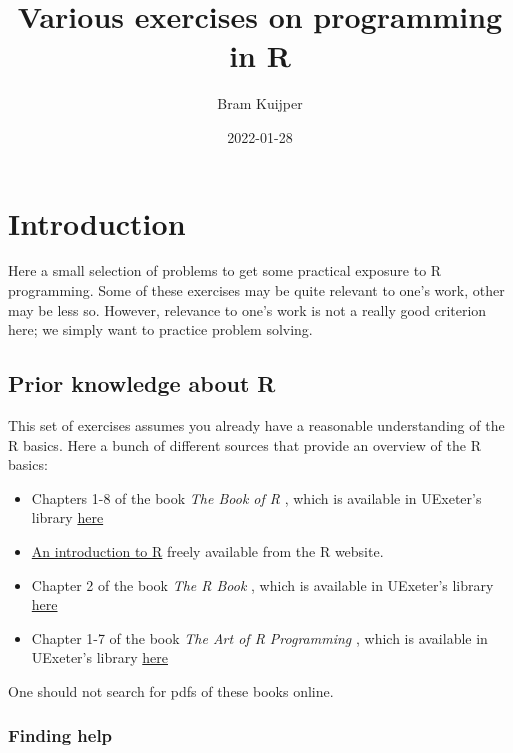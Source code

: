 \documentclass[
]{book}
\title{Various exercises on programming in R}
\author{Bram Kuijper}
\date{2022-01-28}
\providecommand{\tightlist}{%
  \setlength{\itemsep}{0pt}\setlength{\parskip}{0pt}}
\begin{document}
\maketitle

{
\setcounter{tocdepth}{1}
\tableofcontents
}
\hypertarget{introduction}{%
\chapter{Introduction}\label{introduction}}

Here a small selection of problems to get some practical exposure to R programming. Some of these exercises may be quite relevant to one's work, other may be less so. However, relevance to one's work is not a really good criterion here; we simply want to practice problem solving.

\hypertarget{prior-knowledge-about-r}{%
\section{Prior knowledge about R}\label{prior-knowledge-about-r}}

This set of exercises assumes you already have a reasonable understanding of the R basics. Here a bunch of different sources that provide an overview of the R basics:

\begin{itemize}
\tightlist
\item
  Chapters 1-8 of the book \emph{The Book of R} \citep{Davies2016}, which is available in UExeter's library \href{https://encore.exeter.ac.uk/iii/encore/record/C__Rb3554370}{here}
\item
  \href{https://cran.r-project.org/doc/manuals/r-release/R-intro.html}{An introduction to R} freely available from the R website.
\item
  Chapter 2 of the book \emph{The R Book} \citep{Crawley2013}, which is available in UExeter's library \href{https://encore.exeter.ac.uk/iii/encore/record/C__Rb3361719}{here}
\item
  Chapter 1-7 of the book \emph{The Art of R Programming} \citep{Matloff2011}, which is available in UExeter's library \href{https://encore.exeter.ac.uk/iii/encore/record/C__Rb3509192}{here}
\end{itemize}

One should not search for pdfs of these books online.

\hypertarget{finding-help}{%
\subsection{Finding help}\label{finding-help}}
\end{document}
